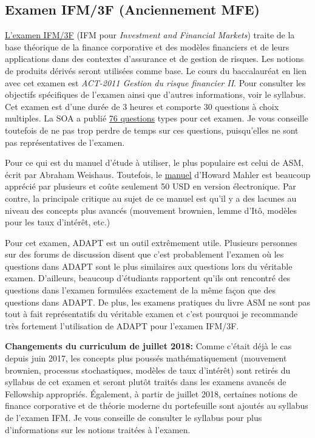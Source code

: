 \newpage
\subsection*{Examen IFM/3F (Anciennement MFE)}
\label{subsec:exammfe}
\href{https://www.soa.org/Education/Exam-Req/edu-exam-ifm-detail.aspx}{L'examen IFM/3F} (IFM pour \textit{Investment and Financial Markets}) traite de la base théorique de la finance corporative et des modèles financiers et de leurs applications dans des contextes d'assurance et de gestion de risques. Les notions de produits dérivés seront utilisées comme base. Le cours du baccalauréat en lien avec cet examen est \textit{ACT-2011 Gestion du risque financier II}. Pour consulter les objectifs spécifiques de l'examen ainsi que d'autres informations, voir le syllabus. Cet examen est d'une durée de 3 heures et comporte 30 questions à choix multiples. La SOA a publié \href{http://www.soa.org/files/edu/edu-exam-mfe-sample-quest-sol.pdf}{76 questions} types pour cet examen. Je vous conseille toutefois de ne pas trop perdre de temps sur ces questions, puisqu'elles ne sont pas représentatives de l'examen.\vspace{\baselineskip}

Pour ce qui est du manuel d'étude à utiliser, le plus populaire est celui de ASM, écrit par Abraham Weishaus. Toutefois, le \href{http://howardmahler.com/Teaching/MFE.html}{manuel} d'Howard Mahler est beaucoup apprécié par plusieurs et coûte seulement 50 USD en version électronique. Par contre, la principale critique au sujet de ce manuel est qu'il y a des lacunes au niveau des concepts plus avancés (mouvement brownien, lemme d'Itô, modèles pour les taux d'intérêt, etc.)\vspace{\baselineskip}

Pour cet examen, ADAPT est un outil extrêmement utile. Plusieurs personnes sur des forums de discussion disent que c'est probablement l'examen où les questions dans ADAPT sont le plus similaires aux questions lors du véritable examen. D'ailleurs, beaucoup d'étudiants rapportent qu'ils ont rencontré des questions dans l'examen formulées exactement de la même façon que des questions dans ADAPT. De plus, les examens pratiques du livre ASM ne sont pas tout à fait représentatifs du véritable examen et c'est pourquoi je recommande très fortement l'utilisation de ADAPT pour l'examen IFM/3F.\vspace{\baselineskip}

\textbf{Changements du curriculum de juillet 2018:} Comme c'était déjà le cas depuis juin 2017, les concepts plus poussés mathématiquement (mouvement brownien, processus stochastiques, modèles de taux d'intérêt) sont retirés du syllabus de cet examen et seront plutôt traités dans les examens avancés de Fellowship appropriés. Également, à partir de juillet 2018, certaines notions de finance corporative et de théorie moderne du portefeuille sont ajoutés au syllabus de l'examen IFM. Je vous conseille de consulter le syllabus pour plus d'informations sur les notions traitées à l'examen.


